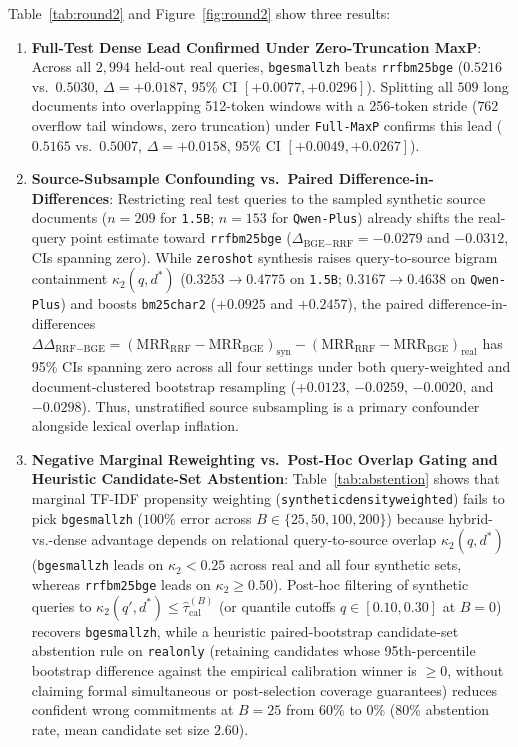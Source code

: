 \documentclass[10pt,twocolumn]{article}
\renewcommand{\_}{\textunderscore\allowbreak}
\begin{document}
Table~\ref{tab:round2} and Figure~\ref{fig:round2} show three results:
\begin{enumerate}[leftmargin=*,nosep]
  \item \textbf{Full-Test Dense Lead Confirmed Under Zero-Truncation MaxP}: Across all $2{,}994$ held-out real queries, \texttt{bge\_small\_zh} beats \texttt{rrf\_bm25\_bge} ($0.5216$ vs.\ $0.5030$, $\Delta = +0.0187$, 95\% CI $[+0.0077, +0.0296]$). Splitting all $509$ long documents into overlapping 512-token windows with a 256-token stride ($762$ overflow tail windows, zero truncation) under \texttt{Full-MaxP} confirms this lead ($0.5165$ vs.\ $0.5007$, $\Delta = +0.0158$, 95\% CI $[+0.0049, +0.0267]$).
  \item \textbf{Source-Subsample Confounding vs.\ Paired Difference-in-Differences}: Restricting real test queries to the sampled synthetic source documents ($n=209$ for \texttt{1.5B}; $n=153$ for \texttt{Qwen-Plus}) already shifts the real-query point estimate toward \texttt{rrf\_bm25\_bge} ($\Delta_{\text{BGE}-\text{RRF}} = -0.0279$ and $-0.0312$, CIs spanning zero). While \texttt{zero\_shot} synthesis raises query-to-source bigram containment $\kappa_2(q, d^*)$ ($0.3253 \rightarrow 0.4775$ on \texttt{1.5B}; $0.3167 \rightarrow 0.4638$ on \texttt{Qwen-Plus}) and boosts \texttt{bm25\_char2} ($+0.0925$ and $+0.2457$), the paired difference-in-differences $\Delta\Delta_{\text{RRF}-\text{BGE}} = (\text{MRR}_{\text{RRF}}-\text{MRR}_{\text{BGE}})_{\text{syn}} - (\text{MRR}_{\text{RRF}}-\text{MRR}_{\text{BGE}})_{\text{real}}$ has 95\% CIs spanning zero across all four settings under both query-weighted and document-clustered bootstrap resampling ($+0.0123$, $-0.0259$, $-0.0020$, and $-0.0298$). Thus, unstratified source subsampling is a primary confounder alongside lexical overlap inflation.
  \item \textbf{Negative Marginal Reweighting vs.\ Post-Hoc Overlap Gating and Heuristic Candidate-Set Abstention}: Table~\ref{tab:abstention} shows that marginal TF-IDF propensity weighting (\texttt{synthetic\_density\_weighted}) fails to pick \texttt{bge\_small\_zh} ($100\%$ error across $B \in \{25, 50, 100, 200\}$) because hybrid-vs.-dense advantage depends on relational query-to-source overlap $\kappa_2(q, d^*)$ (\texttt{bge\_small\_zh} leads on $\kappa_2 < 0.25$ across real and all four synthetic sets, whereas \texttt{rrf\_bm25\_bge} leads on $\kappa_2 \ge 0.50$). Post-hoc filtering of synthetic queries to $\kappa_2(q', d^*) \le \hat{\tau}_{\text{cal}}^{(B)}$ (or quantile cutoffs $q \in [0.10, 0.30]$ at $B=0$) recovers \texttt{bge\_small\_zh}, while a heuristic paired-bootstrap candidate-set abstention rule on \texttt{real\_only} (retaining candidates whose 95th-percentile bootstrap difference against the empirical calibration winner is $\ge 0$, without claiming formal simultaneous or post-selection coverage guarantees) reduces confident wrong commitments at $B=25$ from $60\%$ to $0\%$ ($80\%$ abstention rate, mean candidate set size $2.60$).
\end{enumerate}
\end{document}
